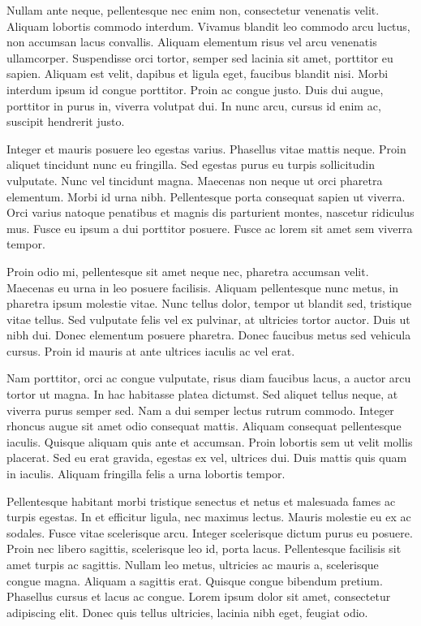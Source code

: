 \documentclass{homework}
\begin{document}
Nullam ante neque, pellentesque nec enim non, consectetur venenatis velit. Aliquam lobortis commodo interdum. Vivamus blandit leo commodo arcu luctus, non accumsan lacus convallis. Aliquam elementum risus vel arcu venenatis ullamcorper. Suspendisse orci tortor, semper sed lacinia sit amet, porttitor eu sapien. Aliquam est velit, dapibus et ligula eget, faucibus blandit nisi. Morbi interdum ipsum id congue porttitor. Proin ac congue justo. Duis dui augue, porttitor in purus in, viverra volutpat dui. In nunc arcu, cursus id enim ac, suscipit hendrerit justo.

Integer et mauris posuere leo egestas varius. Phasellus vitae mattis neque. Proin aliquet tincidunt nunc eu fringilla. Sed egestas purus eu turpis sollicitudin vulputate. Nunc vel tincidunt magna. Maecenas non neque ut orci pharetra elementum. Morbi id urna nibh. Pellentesque porta consequat sapien ut viverra. Orci varius natoque penatibus et magnis dis parturient montes, nascetur ridiculus mus. Fusce eu ipsum a dui porttitor posuere. Fusce ac lorem sit amet sem viverra tempor.

Proin odio mi, pellentesque sit amet neque nec, pharetra accumsan velit. Maecenas eu urna in leo posuere facilisis. Aliquam pellentesque nunc metus, in pharetra ipsum molestie vitae. Nunc tellus dolor, tempor ut blandit sed, tristique vitae tellus. Sed vulputate felis vel ex pulvinar, at ultricies tortor auctor. Duis ut nibh dui. Donec elementum posuere pharetra. Donec faucibus metus sed vehicula cursus. Proin id mauris at ante ultrices iaculis ac vel erat.

Nam porttitor, orci ac congue vulputate, risus diam faucibus lacus, a auctor arcu tortor ut magna. In hac habitasse platea dictumst. Sed aliquet tellus neque, at viverra purus semper sed. Nam a dui semper lectus rutrum commodo. Integer rhoncus augue sit amet odio consequat mattis. Aliquam consequat pellentesque iaculis. Quisque aliquam quis ante et accumsan. Proin lobortis sem ut velit mollis placerat. Sed eu erat gravida, egestas ex vel, ultrices dui. Duis mattis quis quam in iaculis. Aliquam fringilla felis a urna lobortis tempor.

Pellentesque habitant morbi tristique senectus et netus et malesuada fames ac turpis egestas. In et efficitur ligula, nec maximus lectus. Mauris molestie eu ex ac sodales. Fusce vitae scelerisque arcu. Integer scelerisque dictum purus eu posuere. Proin nec libero sagittis, scelerisque leo id, porta lacus. Pellentesque facilisis sit amet turpis ac sagittis. Nullam leo metus, ultricies ac mauris a, scelerisque congue magna. Aliquam a sagittis erat. Quisque congue bibendum pretium. Phasellus cursus et lacus ac congue. Lorem ipsum dolor sit amet, consectetur adipiscing elit. Donec quis tellus ultricies, lacinia nibh eget, feugiat odio.
\end{document}
